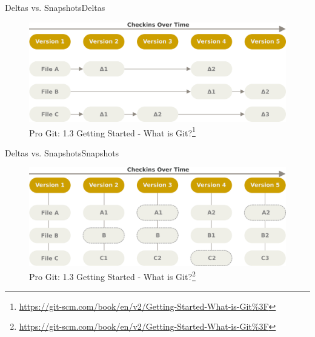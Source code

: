 \documentclass{beamer}
\begin{document}
\begin{frame}{Deltas vs. Snapshots}{Deltas}
\begin{figure}
	\centering
	\includegraphics[width=1\textwidth]{deltas}
	\caption{
		Pro Git: 1.3 Getting Started - What is Git?\footnote{\url{https://git-scm.com/book/en/v2/Getting-Started-What-is-Git\%3F}}
	}
\end{figure}
\end{frame}

\begin{frame}{Deltas vs. Snapshots}{Snapshots}
\begin{figure}
	\centering
	\includegraphics[width=1\textwidth]{snapshots}
	\caption{
		Pro Git: 1.3 Getting Started - What is Git?\footnote{\url{https://git-scm.com/book/en/v2/Getting-Started-What-is-Git\%3F}}
	}
\end{figure}
\end{frame}
\end{document}

